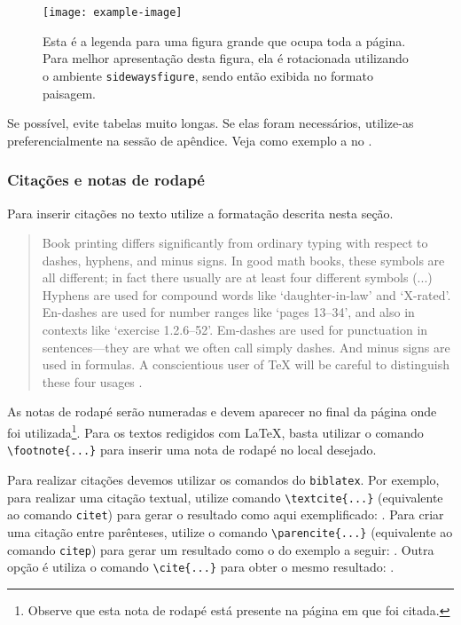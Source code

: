 \documentclass{textolivre}
\begin{document}
\begin{sidewaysfigure}
\centering
\texttt{[image: example-image]}
\caption{Esta é a legenda para uma figura grande que ocupa toda a página. Para melhor apresentação desta figura, ela é rotacionada utilizando o ambiente \texttt{sidewaysfigure}, sendo então exibida no formato paisagem.}
\label{fig:landscape}
\end{sidewaysfigure}


Se possível, evite tabelas muito longas. Se elas foram necessários, utilize-as preferencialmente na sessão de apêndice. 
Veja como exemplo a  no .



\subsubsection{Citações e notas de rodapé}\label{sec-quotesandfootnotes}
Para inserir citações no texto utilize a formatação descrita nesta seção. 

\begin{quote}
Book printing differs significantly from ordinary typing with respect to dashes, hyphens, and minus signs.
In good math books, these symbols are all different; in fact there usually are at least four different symbols (...)
Hyphens are used for compound words like `daughter-in-law' and `X-rated'. En-dashes are used for number ranges like 
`pages 13--34', and also in contexts like `exercise 1.2.6--52'. 
Em-dashes are used for punctuation in sentences---they are what we often call simply dashes. 
And minus signs are used in formulas. A conscientious user of \TeX{} will be careful to distinguish these four usages 
\cite[p. 4]{donaldknuth1984}.
\end{quote}

As notas de rodapé serão numeradas e devem aparecer no final da página onde foi utilizada\footnote{
Observe que esta nota de rodapé está presente na página em que foi citada.}. Para os textos 
redigidos com \LaTeX{}, basta utilizar o comando \verb|\footnote{...}| para inserir uma nota de rodapé
no local desejado.

Para realizar citações devemos utilizar os comandos do \texttt{biblatex}. Por exemplo, para realizar uma
citação textual, utilize comando \verb|\textcite{...}| (equivalente ao comando \texttt{citet}) para gerar o
resultado como aqui exemplificado: \textcite{donaldknuth1984}. 
Para criar uma citação entre parênteses, utilize o comando \verb|\parencite{...}| (equivalente ao comando \texttt{citep})
para gerar um resultado como o do exemplo a seguir: \parencite{donaldknuth1984}.
Outra opção é utiliza o comando \verb|\cite{...}| para obter o mesmo resultado: \cite{donaldknuth1984}.
\end{document}
